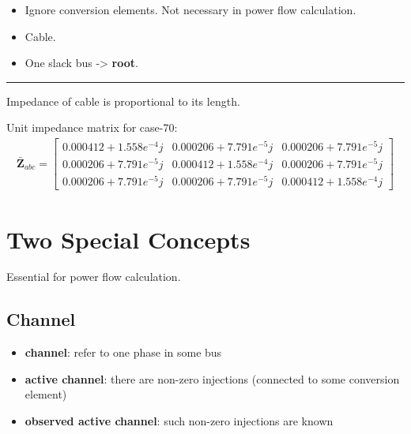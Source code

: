 \documentclass[
]{book}
\providecommand{\tightlist}{%
  \setlength{\itemsep}{0pt}\setlength{\parskip}{0pt}}
\begin{document}
\begin{itemize}
\tightlist
\item
  Ignore conversion elements. Not necessary in power flow calculation.
\item
  Cable.
\item
  One slack bus -\textgreater{} \textbf{root}.
\end{itemize}

\begin{center}\rule{0.5\linewidth}{0.5pt}\end{center}

Impedance of cable is proportional to its length.

Unit impedance matrix for case-70:
\[ \begin{aligned}
  \boldsymbol{\bar{Z}}_{a b c}
  =
  \left[\begin{array}{lll}
    0.000412+1.558e^{-4} j
    & 0.000206+7.791e^{-5} j
    & 0.000206+7.791e^{-5} j \\
    0.000206+7.791e^{-5} j
    & 0.000412+1.558e^{-4} j
    & 0.000206+7.791e^{-5} j \\
    0.000206+7.791e^{-5} j
    & 0.000206+7.791e^{-5} j
    & 0.000412+1.558e^{-4}j
  \end{array}\right]
  \nonumber
\end{aligned} \]

\hypertarget{two-special-concepts}{%
\section{Two Special Concepts}\label{two-special-concepts}}

Essential for power flow calculation.

\hypertarget{channel}{%
\subsection*{Channel}\label{channel}}

\begin{itemize}
\tightlist
\item
  \textbf{channel}: refer to one phase in some bus
\item
  \textbf{active channel}: there are non-zero injections (connected to some
  conversion element)
\item
  \textbf{observed active channel}: such non-zero injections are known
\end{itemize}
\end{document}
